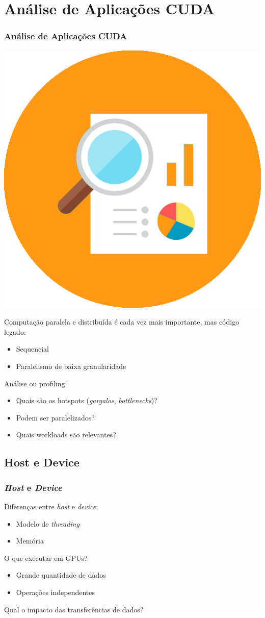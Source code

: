\documentclass[10pt, compress]{beamer}
\begin{document}
\section{Análise de Aplicações CUDA}

\begin{frame}
    \frametitle{Análise de Aplicações CUDA}
    \begin{center}
        \includegraphics[width=.2\textwidth]{data_profile}
    \end{center}

    Computação \alert{paralela} e \alert{distribuída} é cada vez mais
    importante, mas \alert{código legado}:
    \pause
    \begin{itemize}
        \item \alert{Sequencial}
            \pause
        \item Paralelismo de \alert{baixa granularidade}
    \end{itemize}
    \pause

    Análise ou \alert{profiling}:
    \pause
    \begin{itemize}
        \item Quais são os \alert{hotspots} (\textit{gargalos}, \textit{bottlenecks})?
            \pause
        \item Podem ser paralelizados?
            \pause
        \item Quais \alert{workloads} são relevantes?
    \end{itemize}
\end{frame}

\subsection{Host e Device}

\begin{frame}
    \frametitle{\textit{Host} e \textit{Device}}
    Diferenças entre \textit{host} e \textit{device}:
    \begin{itemize}
        \item Modelo de \textit{threading}
            \pause
        \item Memória
    \end{itemize}

    \pause
    O que executar em \alert{GPUs}?
    \pause
    \begin{itemize}
        \item Grande quantidade de \alert{dados}
            \pause
        \item Operações \alert{independentes}
    \end{itemize}
    \pause

    Qual o impacto das \alert{transferências de dados}?
\end{frame}
\end{document}
